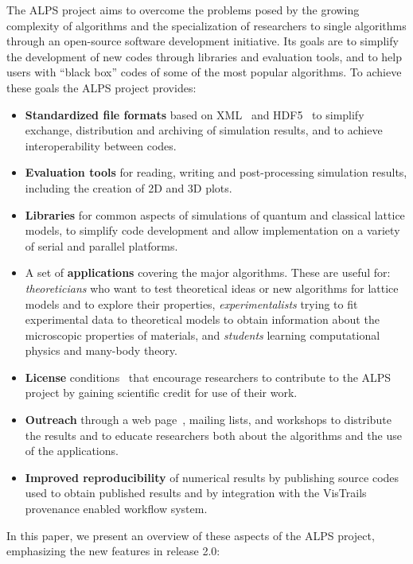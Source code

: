 \documentclass[12pt]{iopart}
\begin{document}
The ALPS project aims to
overcome the problems posed by the growing complexity of algorithms
and the specialization of researchers to single algorithms through
an open-source software development initiative. Its goals are to simplify the development of new codes through libraries and evaluation tools, and to help users with ``black box'' codes of some of the most popular algorithms. To achieve these goals the ALPS project provides:
\begin{itemize}
\item {\bf Standardized file formats} based on XML~\cite{xml} and HDF5~\cite{hdf5} to simplify exchange,
distribution and archiving of simulation results, and to achieve
interoperability between codes.

\item {\bf Evaluation tools} for reading, writing and post-processing simulation results, including the creation of 2D and 3D plots.

\item {\bf Libraries} for common aspects of
simulations of quantum and classical lattice models, to simplify code
development and allow implementation on a variety of serial and parallel platforms.
\item A set of {\bf applications} covering the major algorithms. These are useful for: 
{\it theoreticians} who want to test theoretical ideas or new algorithms for
lattice models and to explore their properties,  
{\it experimentalists} trying to fit experimental data to theoretical
models to obtain information about the microscopic properties of
materials, and {\it students} learning computational physics and many-body theory.
\item{\bf License} conditions~\cite{librarylicense,applicationlicense} that encourage researchers to contribute
to the ALPS project by gaining scientific credit for use of their
work.
\item {\bf Outreach} through a web page~\cite{alps}, mailing lists, and
workshops to distribute the results and to educate researchers both
about the algorithms and the use of the applications.
\item {\bf Improved reproducibility} of numerical results by
publishing source codes used to obtain published results and by integration with the VisTrails~\cite{vistrails} provenance enabled workflow system.
\end{itemize}


 In this paper, we present an overview of these
 aspects of the ALPS project, emphasizing the new features in release 2.0:
 
\end{document}
